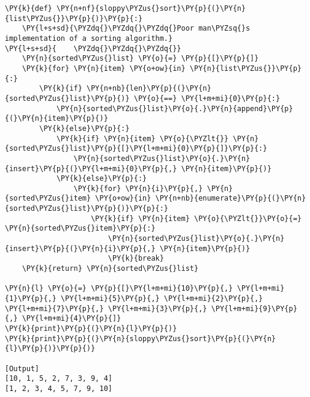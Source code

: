 \begin{Verbatim}[label=\makebox{\url{https://github.com/lucabaldini/cmepda/tree/master/slides/latex/snippets/sloppy\_sort.py}},commandchars=\\\{\}]
\PY{k}{def} \PY{n+nf}{sloppy\PYZus{}sort}\PY{p}{(}\PY{n}{list\PYZus{}}\PY{p}{)}\PY{p}{:}
    \PY{l+s+sd}{\PYZdq{}\PYZdq{}\PYZdq{}Poor man\PYZsq{}s implementation of a sorting algorithm.}
\PY{l+s+sd}{    \PYZdq{}\PYZdq{}\PYZdq{}}
    \PY{n}{sorted\PYZus{}list} \PY{o}{=} \PY{p}{[}\PY{p}{]}
    \PY{k}{for} \PY{n}{item} \PY{o+ow}{in} \PY{n}{list\PYZus{}}\PY{p}{:}
        \PY{k}{if} \PY{n+nb}{len}\PY{p}{(}\PY{n}{sorted\PYZus{}list}\PY{p}{)} \PY{o}{==} \PY{l+m+mi}{0}\PY{p}{:}
            \PY{n}{sorted\PYZus{}list}\PY{o}{.}\PY{n}{append}\PY{p}{(}\PY{n}{item}\PY{p}{)}
        \PY{k}{else}\PY{p}{:}
            \PY{k}{if} \PY{n}{item} \PY{o}{\PYZlt{}} \PY{n}{sorted\PYZus{}list}\PY{p}{[}\PY{l+m+mi}{0}\PY{p}{]}\PY{p}{:}
                \PY{n}{sorted\PYZus{}list}\PY{o}{.}\PY{n}{insert}\PY{p}{(}\PY{l+m+mi}{0}\PY{p}{,} \PY{n}{item}\PY{p}{)}
            \PY{k}{else}\PY{p}{:}
                \PY{k}{for} \PY{n}{i}\PY{p}{,} \PY{n}{sorted\PYZus{}item} \PY{o+ow}{in} \PY{n+nb}{enumerate}\PY{p}{(}\PY{n}{sorted\PYZus{}list}\PY{p}{)}\PY{p}{:}
                    \PY{k}{if} \PY{n}{item} \PY{o}{\PYZlt{}}\PY{o}{=} \PY{n}{sorted\PYZus{}item}\PY{p}{:}
                        \PY{n}{sorted\PYZus{}list}\PY{o}{.}\PY{n}{insert}\PY{p}{(}\PY{n}{i}\PY{p}{,} \PY{n}{item}\PY{p}{)}
                        \PY{k}{break}
    \PY{k}{return} \PY{n}{sorted\PYZus{}list}

\PY{n}{l} \PY{o}{=} \PY{p}{[}\PY{l+m+mi}{10}\PY{p}{,} \PY{l+m+mi}{1}\PY{p}{,} \PY{l+m+mi}{5}\PY{p}{,} \PY{l+m+mi}{2}\PY{p}{,} \PY{l+m+mi}{7}\PY{p}{,} \PY{l+m+mi}{3}\PY{p}{,} \PY{l+m+mi}{9}\PY{p}{,} \PY{l+m+mi}{4}\PY{p}{]}
\PY{k}{print}\PY{p}{(}\PY{n}{l}\PY{p}{)}
\PY{k}{print}\PY{p}{(}\PY{n}{sloppy\PYZus{}sort}\PY{p}{(}\PY{n}{l}\PY{p}{)}\PY{p}{)}

[Output]
[10, 1, 5, 2, 7, 3, 9, 4]
[1, 2, 3, 4, 5, 7, 9, 10]
\end{Verbatim}
